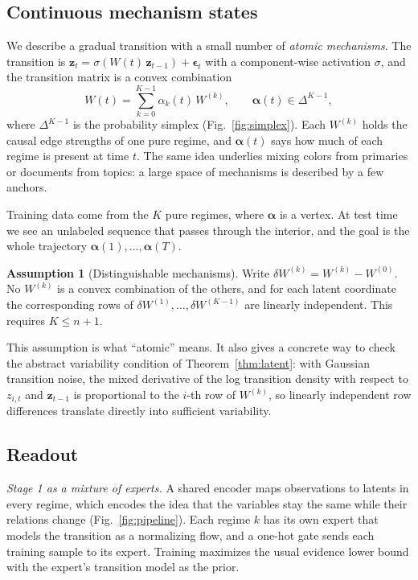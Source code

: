 \documentclass[10pt,twocolumn,letterpaper]{article}
\newcommand{\vz}{\mathbf{z}}
\newcommand{\valpha}{\boldsymbol{\alpha}}
\newcommand{\veps}{\boldsymbol{\epsilon}}
\newcommand{\para}[1]{\textit{#1.}}
\theoremstyle{definition}
\newtheorem{assumption}{Assumption}
\begin{document}
\subsection{Continuous mechanism states}

We describe a gradual transition with a small number of \emph{atomic mechanisms}.
The transition is $\vz_t=\sigma(W(t)\,\vz_{t-1})+\veps_t$ with a component-wise activation $\sigma$, and the transition matrix is a convex combination
\begin{equation}
W(t)=\sum_{k=0}^{K-1}\alpha_k(t)\,W^{(k)},\qquad \valpha(t)\in\Delta^{K-1},
\label{eq:convex}
\end{equation}
where $\Delta^{K-1}$ is the probability simplex (Fig.~\ref{fig:simplex}).
Each $W^{(k)}$ holds the causal edge strengths of one pure regime, and $\valpha(t)$ says how much of each regime is present at time $t$.
The same idea underlies mixing colors from primaries or documents from topics: a large space of mechanisms is described by a few anchors.

Training data come from the $K$ pure regimes, where $\valpha$ is a vertex.
At test time we see an unlabeled sequence that passes through the interior, and the goal is the whole trajectory $\valpha(1),\dots,\valpha(T)$.

\begin{assumption}[Distinguishable mechanisms]
\label{ass:distinct}
Write $\delta W^{(k)}=W^{(k)}-W^{(0)}$.
No $W^{(k)}$ is a convex combination of the others, and for each latent coordinate the corresponding rows of $\delta W^{(1)},\dots,\delta W^{(K-1)}$ are linearly independent.
This requires $K\le n+1$.
\end{assumption}

This assumption is what ``atomic'' means.
It also gives a concrete way to check the abstract variability condition of Theorem~\ref{thm:latent}: with Gaussian transition noise, the mixed derivative of the log transition density with respect to $z_{i,t}$ and $\vz_{t-1}$ is proportional to the $i$-th row of $W^{(k)}$, so linearly independent row differences translate directly into sufficient variability.

\subsection{Readout}

\para{Stage 1 as a mixture of experts}
A shared encoder maps observations to latents in every regime, which encodes the idea that the variables stay the same while their relations change (Fig.~\ref{fig:pipeline}).
Each regime $k$ has its own expert that models the transition as a normalizing flow, and a one-hot gate sends each training sample to its expert.
Training maximizes the usual evidence lower bound with the expert's transition model as the prior.
\end{document}
